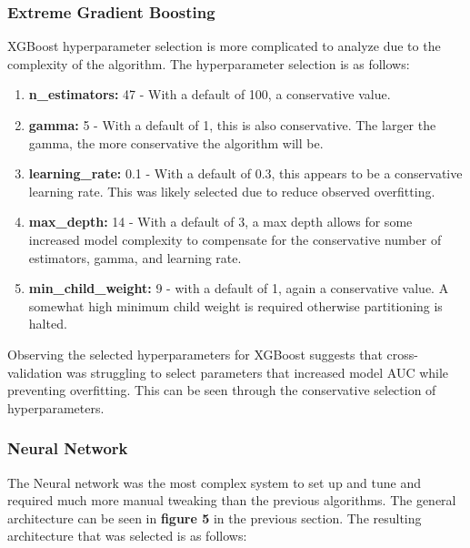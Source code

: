 \documentclass[11pt]{article}
\begin{document}
	\subsubsection{Extreme Gradient Boosting}
	XGBoost hyperparameter selection is more complicated to analyze due to the complexity of the algorithm. The hyperparameter selection is as follows:
	
	\begin{enumerate}
		\item \textbf{n\_estimators:} 47 - With a default of 100, a conservative value.
		\item \textbf{gamma:} 5 - With a default of 1, this is also conservative. The larger the gamma, the more conservative the algorithm will be. 
		\item \textbf{learning\_rate:} 0.1 - With a default of 0.3, this appears to be a conservative learning rate. This was likely selected due to reduce observed overfitting.
		\item \textbf{max\_depth:} 14 - With a default of 3, a max depth allows for some increased model complexity to compensate for the conservative number of estimators, gamma, and learning rate.
		\item \textbf{min\_child\_weight:} 9 - with a default of 1, again a conservative value. A somewhat high minimum child weight is required otherwise partitioning is halted.
	\end{enumerate}
	
	Observing the selected hyperparameters for XGBoost suggests that cross-validation was struggling to select parameters that increased model AUC while preventing overfitting. This can be seen through the conservative selection of hyperparameters. 
	\subsubsection{Neural Network}
	
	The Neural network was the most complex system to set up and tune and required much more manual tweaking than the previous algorithms. The general architecture can be seen in \textbf{figure 5} in the previous section. The resulting architecture that was selected is as follows:
	
\end{document}
